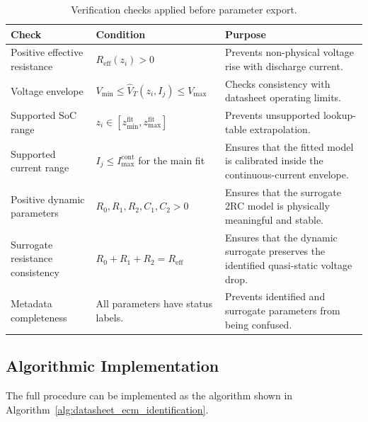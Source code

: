 \documentclass[a4paper,12pt]{article}
\begin{document}
\begin{table}[H]
\centering
\caption{Verification checks applied before parameter export.}
\label{tab:method_verification_checks}
\begin{tabularx}{0.98\textwidth}{@{}L{0.30\textwidth}L{0.32\textwidth}Y@{}}
\toprule
\textbf{Check} &
\textbf{Condition} &
\textbf{Purpose} \\
\midrule
Positive effective resistance &
\(R_{\mathrm{eff}}(z_i)>0\) &
Prevents non-physical voltage rise with discharge current. \\
Voltage envelope &
\(V_{\min}\leq \hat{V}_T(z_i,I_j)\leq V_{\max}\) &
Checks consistency with datasheet operating limits. \\
Supported SoC range &
\(z_i\in[z_{\min}^{\mathrm{fit}},z_{\max}^{\mathrm{fit}}]\) &
Prevents unsupported lookup-table extrapolation. \\
Supported current range &
\(I_j\leq I_{\max}^{\mathrm{cont}}\) for the main fit &
Ensures that the fitted model is calibrated inside the continuous-current envelope. \\
Positive dynamic parameters &
\(R_0,R_1,R_2,C_1,C_2>0\) &
Ensures that the surrogate 2RC model is physically meaningful and stable. \\
Surrogate resistance consistency &
\(R_0+R_1+R_2=R_{\mathrm{eff}}\) &
Ensures that the dynamic surrogate preserves the identified quasi-static voltage drop. \\
Metadata completeness &
All parameters have status labels. &
Prevents identified and surrogate parameters from being confused. \\
\bottomrule
\end{tabularx}
\end{table}

\subsection{Algorithmic Implementation}

The full procedure can be implemented as the algorithm shown in Algorithm~\ref{alg:datasheet_ecm_identification}.
\end{document}
